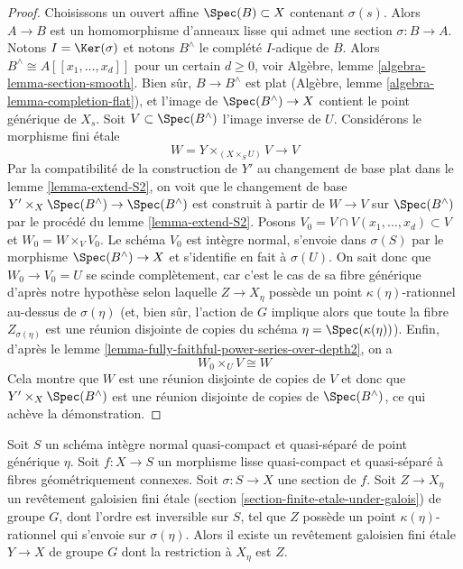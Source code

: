 \begin{proof}
\medskip\noindent
Choisissons un ouvert affine $\Spec(B) \subset X$ contenant $\sigma(s)$.
Alors $A \to B$ est un homomorphisme d'anneaux lisse qui admet une section $\sigma : B \to A$.
Notons $I = \Ker(\sigma)$ et notons $B^\wedge$ le
complété $I$-adique de $B$. Alors $B^\wedge \cong A[[x_1, \ldots, x_d]]$
pour un certain $d \geq 0$, voir
Algèbre, lemme \ref{algebra-lemma-section-smooth}.
Bien sûr, $B \to B^\wedge$ est plat
(Algèbre, lemme \ref{algebra-lemma-completion-flat}),
et l'image de $\Spec(B^\wedge) \to X$ contient le point générique de $X_s$.
Soit $V \subset \Spec(B^\wedge)$ l'image inverse de $U$.
Considérons le morphisme fini \'etale
$$
W = Y \times_{(X \times_S U)} V \longrightarrow V
$$
Par la compatibilité de la construction de $Y'$
au changement de base plat dans le lemme \ref{lemma-extend-S2},
on voit que le changement de base
$Y' \times_X \Spec(B^\wedge) \to \Spec(B^\wedge)$
est construit à partir de $W \to V$ sur $\Spec(B^\wedge)$
par le procédé du lemme \ref{lemma-extend-S2}.
Posons $V_0 = V \cap V(x_1, \ldots, x_d) \subset V$ et $W_0 = W \times_V V_0$.
Le schéma $V_0$ est intègre normal, s'envoie dans $\sigma(S)$
par le morphisme $\Spec(B^\wedge) \to X$ et s'identifie en fait
à $\sigma(U)$. On sait donc que $W_0 \to V_0 = U$ se scinde complètement,
car c'est le cas de sa fibre générique d'après notre hypothèse
selon laquelle $Z \to X_\eta$ possède un point $\kappa(\eta)$-rationnel au-dessus de
$\sigma(\eta)$ (et, bien sûr, l'action de $G$ implique alors que toute la
fibre $Z_{\sigma(\eta)}$ est une réunion disjointe de copies du
schéma $\eta = \Spec(\kappa(\eta))$).
Enfin, d'après le
lemme \ref{lemma-fully-faithful-power-series-over-depth2},
on a
$$
W_0 \times_U V \cong W
$$
Cela montre que $W$ est une réunion disjointe de copies de $V$
et donc que $Y' \times_X \Spec(B^\wedge)$ est une réunion disjointe
de copies de $\Spec(B^\wedge)$, ce qui achève la démonstration.
\end{proof}

\begin{lemma}
\label{lemma-extend-covering-general}
Soit $S$ un schéma intègre normal quasi-compact et quasi-séparé
de point générique $\eta$. Soit $f : X \to S$ un morphisme lisse quasi-compact et
quasi-séparé à fibres géométriquement connexes.
Soit $\sigma : S \to X$ une section de $f$. Soit $Z \to X_\eta$ un
revêtement galoisien fini \'etale (section \ref{section-finite-etale-under-galois})
de groupe $G$, dont l'ordre est inversible sur $S$, tel que
$Z$ possède un point $\kappa(\eta)$-rationnel qui s'envoie sur $\sigma(\eta)$.
Alors il existe un revêtement galoisien fini \'etale $Y \to X$ de groupe $G$
dont la restriction à $X_\eta$ est $Z$.
\end{lemma}

